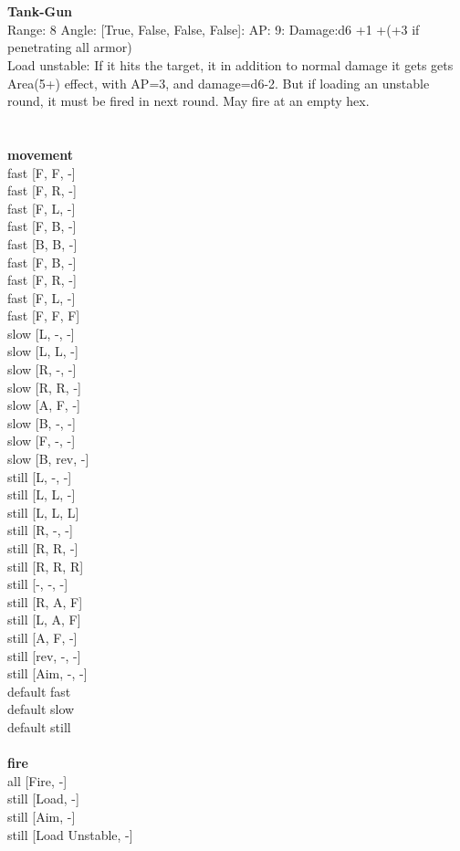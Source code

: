 \ \\

\ \\
{\bf Tank-Gun } \\



Range: 8  Angle: [True, False, False, False]: AP: 9: Damage:d6 +1 +(+3 if penetrating all armor) \\
Load unstable: If it hits the target, it in addition to normal damage it gets gets Area(5+) effect, with AP=3, and damage=d6-2. But if loading an unstable round, it must be fired in next round. May fire at an empty hex.\\ 




 
\ \\




\ \\ {\bf movement } \\
fast [F, F, -] \\
fast [F, R, -] \\
fast [F, L, -] \\
fast [F, B, -] \\
fast [B, B, -] \\
fast [F, B, -] \\
fast [F, R, -] \\
fast [F, L, -] \\
fast [F, F, F] \\
slow [L, -, -] \\
slow [L, L, -] \\
slow [R, -, -] \\
slow [R, R, -] \\
slow [A, F, -] \\
slow [B, -, -] \\
slow [F, -, -] \\
slow [B, rev, -] \\
still [L, -, -] \\
still [L, L, -] \\
still [L, L, L] \\
still [R, -, -] \\
still [R, R, -] \\
still [R, R, R] \\
still [-, -, -] \\
still [R, A, F] \\
still [L, A, F] \\
still [A, F, -] \\
still [rev, -, -] \\
still [Aim, -, -] \\
default fast \\
default slow \\
default still \\
\ \\ {\bf fire } \\
all [Fire, -] \\
still [Load, -] \\
still [Aim, -] \\
still [Load Unstable, -] \\



